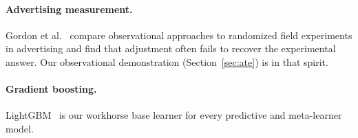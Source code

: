 \paragraph{Advertising measurement.} Gordon et al.~\cite{gordon2019} compare
observational approaches to randomized field experiments in advertising and
find that adjustment often fails to recover the experimental answer. Our
observational demonstration (Section~\ref{sec:ate}) is in that spirit.

\paragraph{Gradient boosting.} LightGBM~\cite{ke2017} is our workhorse
base learner for every predictive and meta-learner model.
